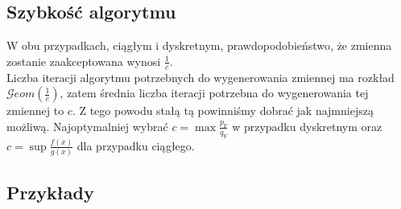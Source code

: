\documentclass[12pt]{mwrep}
\begin{document}
	\subsection{Szybkość algorytmu}
	\noindent W obu przypadkach, ciągłym i dyskretnym, prawdopodobieństwo, że zmienna zostanie zaakceptowana wynosi $\frac{1}{c}$.\\
	Liczba iteracji algorytmu potrzebnych do wygenerowania zmiennej ma rozkład $\mathcal{G}eom(\frac{1}{c})$, zatem średnia liczba iteracji potrzebna do wygenerowania tej zmiennej to $c$. Z tego powodu stałą tą powinniśmy dobrać jak najmniejszą możliwą. Najoptymalniej wybrać $c=\max\frac{p_Y}{q_Y}$ w przypadku dyskretnym oraz $c=\sup\frac{f(x)}{g(x)}$ dla przypadku ciągłego.

	\subsection{Przykłady}
	
\end{document}
